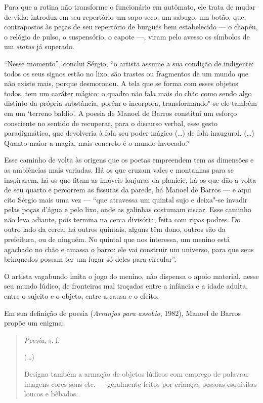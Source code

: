 Para que a rotina não transforme o funcionário em autômato, ele trata de
mudar de vida: introduz em seu repertório um sapo seco, um sabugo, um
botão, que, contrapostos às peças de seu repertório de burguês bem
estabelecido --- o chapéu, o relógio de pulso, o suspensório, o capote
---, viram pelo avesso os símbolos de um \emph{status} já superado.

``Nesse momento'', conclui Sérgio, ``o artista assume a sua condição
de indigente: todos os seus signos estão no lixo, são trastes ou
fragmentos de um mundo que não existe mais, porque desmoronou. A tela
que se forma com esses objetos todos, tem um caráter mágico: o quadro
não fala mais do chão como sendo algo distinto da própria substância,
porém o incorpora, transformando"-se ele também em um `terreno baldio'.
A poesia de Manoel de Barros constitui um esforço consciente no sentido
de recuperar, para o discurso verbal, esse gesto paradigmático, que
devolveria à fala seu poder mágico (\ldots{}) de fala inaugural. (\ldots{}) Quanto
maior a magia, mais concreto é o mundo invocado.''

Esse caminho de volta às origens que os poetas empreendem tem as
dimensões e as ambiências mais variadas. Há os que cruzam vales e
montanhas para se inspirarem, há os que fitam as imóveis
lonjuras da planície, há os que dão a volta de seu quarto e percorrem as
fissuras da parede, há Manoel de Barros --- e aqui cito Sérgio mais uma
vez --- ``que atravessa um quintal sujo e deixa"-se invadir pelas poças
d'água e pelo lixo, onde as galinhas costumam ciscar. Esse caminho não
leva adiante, pois termina na cerca divisória, feita com ripas podres.
Do outro lado da cerca, há outros quintais, alguns têm dono, outros são
da prefeitura, ou de ninguém. No quintal que nos interessa, um menino
está agachado no chão e amassa o barro: ele vai construir um universo,
para que seus brinquedos possam ter um lugar só deles para circular''.

O artista vagabundo imita o jogo do menino, não dispensa o apoio
material, nesse seu mundo lúdico, de fronteiras mal traçadas entre a
infância e a idade adulta, entre o sujeito e o objeto, entre a causa e o
efeito.

Em sua definição de poesia (\emph{Arranjos para assobio}, 1982), Manoel
de Barros propõe um enigma:


\begin{quotation}
\emph{Poesia}, s. f.

(\ldots{})

Designa também a armação de objetos lúdicos com emprego de palavras
imagens cores sons etc. --- geralmente feitos por crianças
pessoas esquisitas loucos e bêbados.
\end{quotation}

